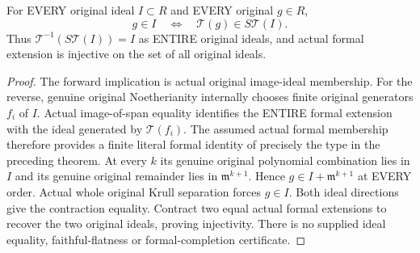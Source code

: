 \begin{theorem}
\label{hir:actual-formal-extension-whole-original-ideal-contraction}
\leanok
For EVERY original ideal $I\subset R$ and EVERY original $g\in R$,
\[
 g\in I\quad\Longleftrightarrow\quad\mathcal T(g)\in S\mathcal T(I).
\]
Thus $\mathcal T^{-1}(S\mathcal T(I))=I$ as ENTIRE original ideals,
and actual formal extension is injective on the set of all original
ideals.
\end{theorem}
\begin{proof}
The forward implication is actual original image-ideal membership.
For the reverse, genuine original Noetherianity internally chooses finite
original generators $f_i$ of $I$. Actual image-of-span equality
identifies the ENTIRE formal extension with the ideal generated by
$\mathcal T(f_i)$. The assumed actual formal membership therefore
provides a finite literal formal identity of precisely the type in the
preceding theorem. At every $k$ its genuine original polynomial
combination lies in $I$ and its genuine original remainder lies in
$\mathfrak m^{k+1}$. Hence $g\in I+\mathfrak m^{k+1}$ at EVERY
order. Actual whole original Krull separation forces $g\in I$.
Both ideal directions give the contraction equality. Contract two equal
actual formal extensions to recover the two original ideals, proving
injectivity. There is no supplied ideal equality, faithful-flatness or
formal-completion certificate.
\end{proof}

